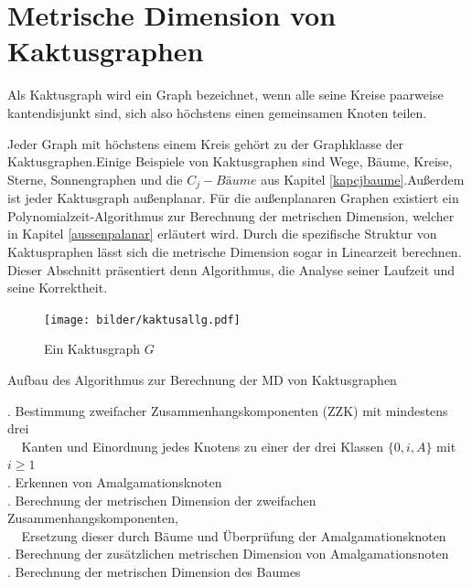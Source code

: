 \chapter{Metrische Dimension von Kaktusgraphen}
\label{kapkaktus}
\begin{defi}
Als Kaktusgraph wird ein Graph bezeichnet, wenn alle seine Kreise paarweise kantendisjunkt sind, sich also höchstens einen gemeinsamen Knoten teilen.
\end{defi}
Jeder Graph mit höchstens einem Kreis gehört zu der Graphklasse der Kaktusgraphen.\newline Einige Beispiele von Kaktusgraphen sind Wege, Bäume, Kreise, Sterne, Sonnengraphen und die $C_j-Bäume$ aus Kapitel \ref{kapcjbaume}.\newline Außerdem ist jeder Kaktusgraph außenplanar. Für die außenplanaren Graphen existiert ein Polynomialzeit-Algorithmus zur Berechnung der metrischen Dimension, welcher in Kapitel \ref{aussenpalanar} erläutert wird. Durch die spezifische Struktur von Kaktuspraphen lässt sich die metrische Dimension sogar in Linearzeit berechnen. Dieser Abschnitt präsentiert denn Algorithmus, die Analyse seiner Laufzeit und seine Korrektheit.
\begin{figure}[h!]
		\centering
 		 \texttt{[image: bilder/kaktusallg.pdf]}
   \caption{Ein Kaktusgraph $G$}
   \label{gk}
  	 \end{figure}
  	 \vspace{-2mm}
\begin{algorithm}
\caption{Aufbau des Algorithmus zur Berechnung der MD von Kaktusgraphen}
\begin{algorithmic}
\vspace{2mm}
\vspace{2mm}
\vspace{2mm}
. Bestimmung zweifacher Zusammenhangskomponenten (ZZK) mit mindestens drei\\$\;\;\;\;$Kanten und Einordnung jedes Knotens zu einer der drei Klassen $\{0,i,A\}$ mit $i \geq 1$\\
\vspace{2mm}
. Erkennen von Amalgamationsknoten\\
\vspace{2mm}
. Berechnung der metrischen Dimension der zweifachen Zusammenhangskomponenten,\\$\;\;\;\;$Ersetzung dieser durch Bäume und Überprüfung der Amalgamationsknoten\\
\vspace{2mm}
. Berechnung der zusätzlichen metrischen Dimension von Amalgamationsnoten\\
\vspace{2mm}
. Berechnung der metrischen Dimension des Baumes
\vspace{2mm}
\end{algorithmic}
\end{algorithm}
\newpage
